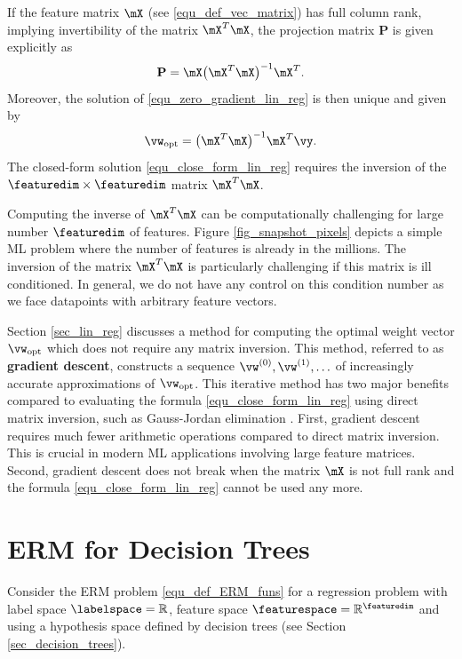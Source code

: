 \documentclass[12pt]{report}
\begin{document}
If the feature matrix $\mX$ (see \eqref{equ_def_vec_matrix}) has full column rank, 
implying invertibility of the matrix $\mX^{T} \mX$, the projection matrix $\mathbf{P}$ 
is given explicitly as 
\begin{equation} 
\nonumber
\mathbf{P} = \mX \big( \mX^{T} \mX \big)^{-1} \mX^{T}. 
\end{equation} 
Moreover, the solution of \eqref{equ_zero_gradient_lin_reg} is then unique and given by 
\begin{equation}
\label{equ_close_form_lin_reg}
\vw_{\rm opt} = \big(  \mX^{T} \mX \big)^{-1} \mX^{T} \vy. 
\end{equation}
The closed-form solution \eqref{equ_close_form_lin_reg} requires 
the inversion of the $\featuredim \times \featuredim$ matrix $\mX^{T} \mX$. 

Computing the inverse of $\mX^{T} \mX$ can be computationally challenging 
for large number $\featuredim$ of features. Figure \ref{fig_snapshot_pixels} 
depicts a simple ML problem where the number of features is already 
in the millions. The inversion of the matrix $\mX^{T} \mX$ is particularly 
challenging if this matrix is ill conditioned. In general, we do not have 
any control on this condition number as we face datapoints with arbitrary 
feature vectors. 

Section \ref{sec_lin_reg} discusses a method for computing the optimal weight vector 
$\vw_{\rm opt}$ which does not require any matrix inversion. This method, 
referred to as {\bf gradient descent}, constructs a sequence 
$\vw^{(0)}, \vw^{(1)},\ldots$ of increasingly accurate approximations 
of $\vw_{\rm opt}$. This iterative method has two major benefits 
compared to evaluating the formula \eqref{equ_close_form_lin_reg} using 
direct matrix inversion, such as Gauss-Jordan elimination \cite{golub96}. 
First, gradient descent requires much fewer arithmetic operations compared 
to direct matrix inversion. This is crucial in modern ML applications involving 
large feature matrices. Second, gradient descent does not break when the 
matrix $\mX$ is not full rank and the formula \eqref{equ_close_form_lin_reg} 
cannot be used any more. 

\section{ERM for Decision Trees}
\label{sec_ERM_decision_tree}

Consider the ERM problem \eqref{equ_def_ERM_funs} for a regression 
problem with label space $\labelspace=\mathbb{R}$, feature space 
$\featurespace= \mathbb{R}^{\featuredim}$ and using a hypothesis 
space defined by decision trees (see Section \ref{sec_decision_trees}). 
\end{document}
